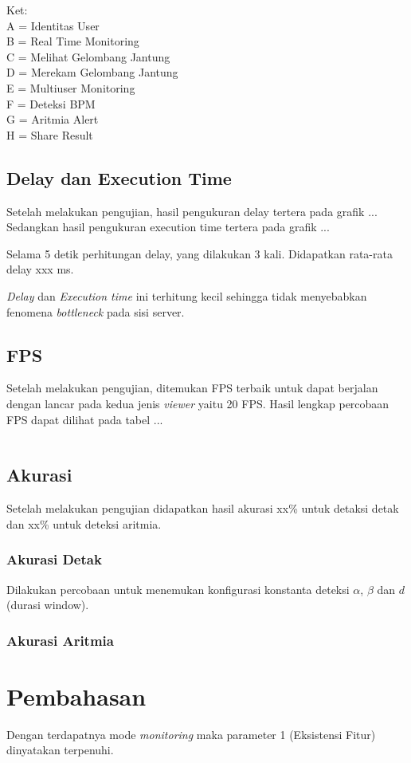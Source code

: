 Ket: \\
A = Identitas User \\
B = Real Time Monitoring \\
C = Melihat Gelombang Jantung \\
D = Merekam Gelombang Jantung \\
E = Multiuser Monitoring \\
F = Deteksi BPM \\
G = Aritmia Alert \\
H = Share Result \\

\subsection{Delay dan Execution Time}
Setelah melakukan pengujian, hasil pengukuran delay tertera pada grafik ... Sedangkan hasil pengukuran execution time tertera pada grafik ...

\begin{figure}[H]

\end{figure}

Selama 5 detik perhitungan delay, yang dilakukan 3 kali. Didapatkan rata-rata delay xxx ms. 

\textit{Delay} dan \textit{Execution time} ini terhitung kecil sehingga tidak menyebabkan fenomena \textit{bottleneck} pada sisi server.

\subsection{FPS}
Setelah melakukan pengujian, ditemukan FPS terbaik untuk dapat berjalan dengan lancar pada kedua jenis \textit{viewer} yaitu 20 FPS. Hasil lengkap percobaan FPS dapat dilihat pada tabel ...

\begin{table}[H]
	\centering
	\begin{tabular}{|l|l|l|l|}
	
	\end{tabular}
\end{table}

\subsection{Akurasi}
Setelah melakukan pengujian didapatkan hasil akurasi xx\% untuk detaksi detak dan xx\% untuk deteksi aritmia.
\subsubsection{Akurasi Detak}
Dilakukan percobaan untuk menemukan konfigurasi konstanta deteksi $\alpha$, $\beta$ dan $d$ (durasi window).
\subsubsection{Akurasi Aritmia}

\section{Pembahasan}
Dengan terdapatnya mode \textit{monitoring} maka parameter 1 (Eksistensi Fitur) dinyatakan terpenuhi.